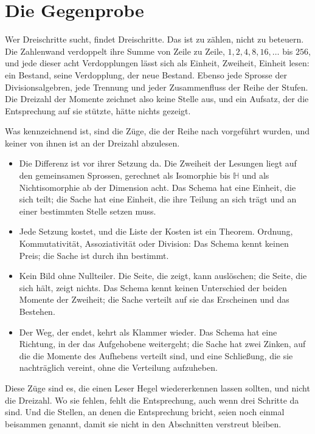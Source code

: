 \documentclass[11pt,a4paper]{article}
\newcommand{\HH}{\mathbb H}
\begin{document}
\section{Die Gegenprobe}
\label{sec:gegenprobe}

Wer Dreischritte sucht, findet Dreischritte. Das ist zu zählen, nicht zu beteuern. Die Zahlenwand verdoppelt ihre Summe von Zeile zu Zeile, $1,2,4,8,16,\ldots$ bis $256$, und jede dieser acht Verdopplungen lässt sich als Einheit, Zweiheit, Einheit lesen: ein Bestand, seine Verdopplung, der neue Bestand. Ebenso jede Sprosse der Divisionsalgebren, jede Trennung und jeder Zusammenfluss der Reihe der Stufen. Die Dreizahl der Momente zeichnet also keine Stelle aus, und ein Aufsatz, der die Entsprechung auf sie stützte, hätte nichts gezeigt.

Was kennzeichnend ist, sind die Züge, die der Reihe nach vorgeführt wurden, und keiner von ihnen ist an der Dreizahl abzulesen.

\begin{itemize}[leftmargin=1.6em,itemsep=2pt]
\item Die Differenz ist vor ihrer Setzung da. Die Zweiheit der Lesungen liegt auf den gemeinsamen Sprossen, gerechnet als Isomorphie bis $\HH$ und als Nichtisomorphie ab der Dimension acht. Das Schema hat eine Einheit, die sich teilt; die Sache hat eine Einheit, die ihre Teilung an sich trägt und an einer bestimmten Stelle setzen muss.
\item Jede Setzung kostet, und die Liste der Kosten ist ein Theorem. Ordnung, Kommutativität, Assoziativität oder Division: Das Schema kennt keinen Preis; die Sache ist durch ihn bestimmt.
\item Kein Bild ohne Nullteiler. Die Seite, die zeigt, kann auslöschen; die Seite, die sich hält, zeigt nichts. Das Schema kennt keinen Unterschied der beiden Momente der Zweiheit; die Sache verteilt auf sie das Erscheinen und das Bestehen.
\item Der Weg, der endet, kehrt als Klammer wieder. Das Schema hat eine Richtung, in der das Aufgehobene weitergeht; die Sache hat zwei Zinken, auf die die Momente des Aufhebens verteilt sind, und eine Schließung, die sie nachträglich vereint, ohne die Verteilung aufzuheben.
\end{itemize}

Diese Züge sind es, die einen Leser Hegel wiedererkennen lassen sollten, und nicht die Dreizahl. Wo sie fehlen, fehlt die Entsprechung, auch wenn drei Schritte da sind. Und die Stellen, an denen die Entsprechung bricht, seien noch einmal beisammen genannt, damit sie nicht in den Abschnitten verstreut bleiben.
\end{document}
